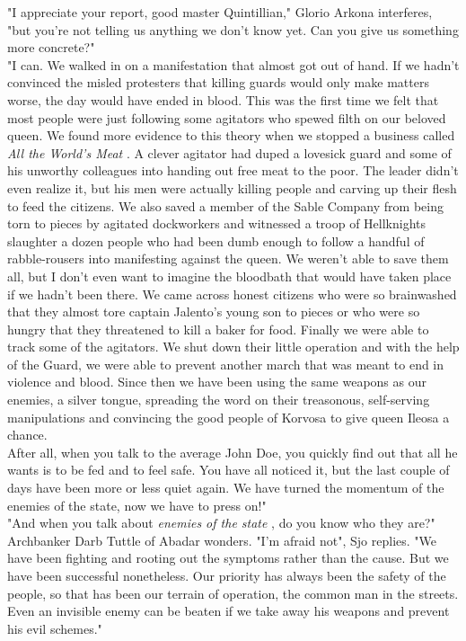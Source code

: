 "I appreciate your report, good master Quintillian," Glorio Arkona interferes, "but you're not telling us anything we don't know yet. Can you give us something more concrete?"\\

"I can. We walked in on a manifestation that almost got out of hand. If we hadn't convinced the misled protesters that killing guards would only make matters worse, the day would have ended in blood. This was the first time we felt that most people were just following some agitators who spewed filth on our beloved queen. We found more evidence to this theory when we stopped a business called {\itshape All the World's Meat} . A clever agitator had duped a lovesick guard and some of his unworthy colleagues into handing out free meat to the poor. The leader didn't even realize it, but his men were actually killing people and carving up their flesh to feed the citizens. We also saved a member of the Sable Company from being torn to pieces by agitated dockworkers and witnessed a troop of Hellknights slaughter a dozen people who had been dumb enough to follow a handful of rabble-rousers into manifesting against the queen. We weren't able to save them all, but I don't even want to imagine the bloodbath that would have taken place if we hadn't been there. We came across honest citizens who were so brainwashed that they almost tore captain Jalento's young son to pieces or who were so hungry that they threatened to kill a baker for food. Finally we were able to track some of the agitators. We shut down their little operation and with the help of the Guard, we were able to prevent another march that was meant to end in violence and blood. Since then we have been using the same weapons as our enemies, a silver tongue, spreading the word on their treasonous, self-serving manipulations and convincing the good people of Korvosa to give queen Ileosa a chance.\\

After all, when you talk to the average John Doe, you quickly find out that all he wants is to be fed and to feel safe. You have all noticed it, but the last couple of days have been more or less quiet again. We have turned the momentum of the enemies of the state, now we have to press on!"\\

"And when you talk about {\itshape enemies of the state} , do you know who they are?" Archbanker Darb Tuttle of Abadar wonders. "I'm afraid not", Sjo replies. "We have been fighting and rooting out the symptoms rather than the cause. But we have been successful nonetheless. Our priority has always been the safety of the people, so that has been our terrain of operation, the common man in the streets. Even an invisible enemy can be beaten if we take away his weapons and prevent his evil schemes."\\

